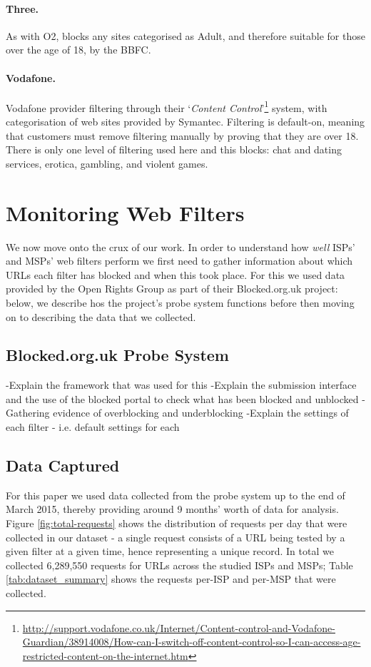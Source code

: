 \documentclass{bmcart}
\begin{document}
\paragraph{Three.}
As with O2, blocks any sites categorised as Adult, and therefore suitable for those over the age of 18, by the BBFC.

\paragraph{Vodafone.}
Vodafone provider filtering through their `\textit{Content Control}'\footnote{\url{http://support.vodafone.co.uk/Internet/Content-control-and-Vodafone-Guardian/38914008/How-can-I-switch-off-content-control-so-I-can-access-age-restricted-content-on-the-internet.htm}} system, with categorisation of web sites provided by Symantec.
Filtering is default-on, meaning that customers must remove filtering manually by proving that they are over 18.
There is only one level of filtering used here and this blocks: chat and dating services, erotica, gambling, and violent games.


\section*{Monitoring Web Filters}
We now move onto the crux of our work.
In order to understand how \textit{well} ISPs' and MSPs' web filters perform we first need to gather information about which URLs each filter has blocked and when this took place.
For this we used data provided by the Open Rights Group as part of their Blocked.org.uk project: below, we describe hos the project's probe system functions before then moving on to describing the data that we collected.

\subsection*{Blocked.org.uk Probe System}
-Explain the framework that was used for this
-Explain the submission interface and the use of the blocked portal to check what has been blocked and unblocked
-Gathering evidence of overblocking and underblocking
-Explain the settings of each filter - i.e. default settings for each

\subsection*{Data Captured}
For this paper we used data collected from the probe system up to the end of March 2015, thereby providing around 9 months' worth of data for analysis.
Figure \ref{fig:total-requests} shows the distribution of requests per day that were collected in our dataset - a single request consists of a URL being tested by a given filter at a given time, hence representing a unique record.
In total we collected 6,289,550 requests for URLs across the studied ISPs and MSPs; Table \ref{tab:dataset_summary} shows the requests per-ISP and per-MSP that were collected.
\end{document}
